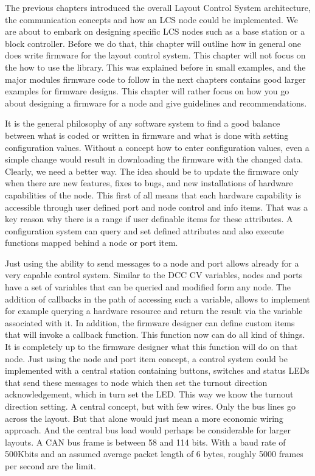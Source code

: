 
The previous chapters introduced the overall Layout Control System architecture, the communication concepts and how an LCS node could be implemented. We are about to embark on designing specific LCS nodes such as a base station or a block controller. Before we do that, this chapter will outline how in general one does write firmware for the layout control system. This chapter will not focus on the how to use the library. This was explained before in small examples, and the major modules firmware code to follow in the next chapters contains good larger examples for firmware designs. This chapter will rather focus on how you go about designing a firmware for a node and give guidelines and recommendations.


It is the general philosophy of any software system to find a good balance between what is coded or written in firmware and what is done with setting configuration values. Without a concept how to enter configuration values, even a simple change would result in downloading the firmware with the changed data. Clearly, we need a better way. The idea should be to update the firmware only when there are new features, fixes to bugs, and new installations of hardware capabilities of the node. This first of all means that each hardware capability is accessible through user defined port and node control and info items. That was a key reason why there is a range if user definable items for these attributes. A configuration system can query and set defined attributes and also execute functions mapped behind a node or port item.

Just using the ability to send messages to a node and port allows already for a very capable control system. Similar to the DCC CV variables, nodes and ports have a set of variables that can be queried and modified form any node. The addition of callbacks in the path of accessing such a variable, allows to implement for example querying a hardware resource and return the result via the variable associated with it. In addition, the firmware designer can define custom items that will invoke a callback function. This function now can do all kind of things. It is completely up to the firmware designer what this function will do on that node. Just using the node and port item concept, a control system could be implemented with a central station containing buttons, switches and status LEDs that send these messages to node which then set the turnout direction acknowledgement, which in turn set the LED. This way we know the turnout direction setting. A central concept, but with few wires. Only the bus lines go across the layout. But that alone would just mean a more economic wiring approach. And the central bus load would perhaps be considerable for larger layouts. A CAN bus frame is between 58 and 114 bits. With a baud rate of 500Kbits and an assumed average packet length of 6 bytes, roughly 5000 frames per second are the limit.

